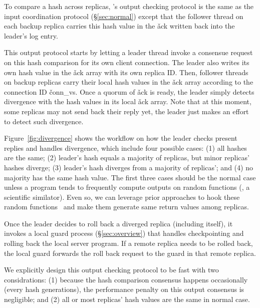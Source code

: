To compare a hash across replicas, \xxx's output checking protocol is the same 
as the input coordination protocol (\S\ref{sec:normal}) except that the 
follower thread on each backup replica carries this hash value in the \v{ack} 
written back into the leader's log entry.

This output protocol starts by letting a leader thread invoke a consensue 
request on this hash comparison for its own client connection. The leader also 
writes its own hash value in the \v{ack} array with its own replica ID. Then, 
follower threads on backup replicas carry their local hash values in the \v{ack} 
array according to the connection ID \v{conn\_vs}. Once a quorum of \v{ack} 
is ready, the leader simply detects divergence with the hash values in its 
local \v{ack} array. Note that at this moment, some replicas may not send back 
their reply yet, the leader just makes an effort to detect such divergence.

Figure~\ref{fig:divergence} shows the workflow on how the leader checks 
present replies and handles divergence, which include four possible cases: 
(1) all hashes are the same; (2) leader's hash equals a majority of replicas, 
but minor replicas' hashes diverge; (3) leader's hash diverges from a majority 
of replicas'; and (4) no majority has the same hash value. The first three 
cases should be the normal case unless a program tends to frequently compute 
outputs on random functions (\eg, a scientific similator). Even so, we can 
leverage prior approaches to hook these 
random functions~\cite{paxos:practical,eve:osdi12} and make them generate same 
return values among replicas.

Once the leader decides to roll back a diverged replica (including itself), it 
invokes a local guard process (\S\ref{sec:overview}) that handles 
checkpointing and rolling back the local server program. If a remote replica 
needs to be rolled back, the local guard forwards the roll back request to the 
guard in that remote replica.

We explicitly design this output checking protocol to be fast with two 
considrations: (1) because the hash comparison consensus happens occasionally 
(every \thashcomp hash generations), the performance penalty on this output 
consensus is negligible; and (2) all or most replicas' hash values are 
the same in normal case.


